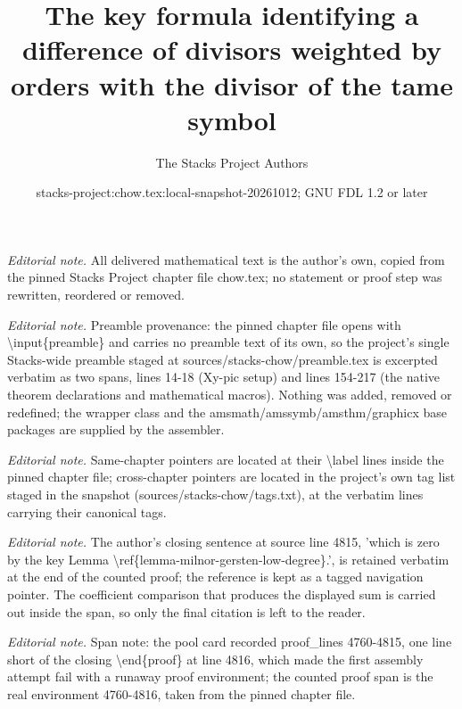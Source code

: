 \documentclass[10pt,a4paper]{amsart}
\title{The key formula identifying a difference of divisors weighted by orders with the divisor of the tame symbol}
\author{The Stacks Project Authors}
\date{stacks-project:chow.tex:local-snapshot-20261012; GNU FDL 1.2 or later}
\theoremstyle{plain}
\theoremstyle{definition}
\theoremstyle{remark}
\numberwithin{equation}{subsection}
\begin{document}
\maketitle
\noindent\textit{Editorial note.} All delivered mathematical text is the author's own, copied from the pinned Stacks Project chapter file chow.tex; no statement or proof step was rewritten, reordered or removed.\par\medskip
\noindent\textit{Editorial note.} Preamble provenance: the pinned chapter file opens with \textbackslash{}input\{preamble\} and carries no preamble text of its own, so the project's single Stacks-wide preamble staged at sources/stacks-chow/preamble.tex is excerpted verbatim as two spans, lines 14-18 (Xy-pic setup) and lines 154-217 (the native theorem declarations and mathematical macros). Nothing was added, removed or redefined; the wrapper class and the amsmath/amssymb/amsthm/graphicx base packages are supplied by the assembler.\par\medskip
\noindent\textit{Editorial note.} Same-chapter pointers are located at their \textbackslash{}label lines inside the pinned chapter file; cross-chapter pointers are located in the project's own tag list staged in the snapshot (sources/stacks-chow/tags.txt), at the verbatim lines carrying their canonical tags.\par\medskip
\noindent\textit{Editorial note.} The author's closing sentence at source line 4815, 'which is zero by the key Lemma \textbackslash{}ref\{lemma-milnor-gersten-low-degree\}.', is retained verbatim at the end of the counted proof; the reference is kept as a tagged navigation pointer. The coefficient comparison that produces the displayed sum is carried out inside the span, so only the final citation is left to the reader.\par\medskip
\noindent\textit{Editorial note.} Span note: the pool card recorded proof\_lines 4760-4815, one line short of the closing \textbackslash{}end\{proof\} at line 4816, which made the first assembly attempt fail with a runaway proof environment; the counted proof span is the real environment 4760-4816, taken from the pinned chapter file.\par\medskip
\end{document}

